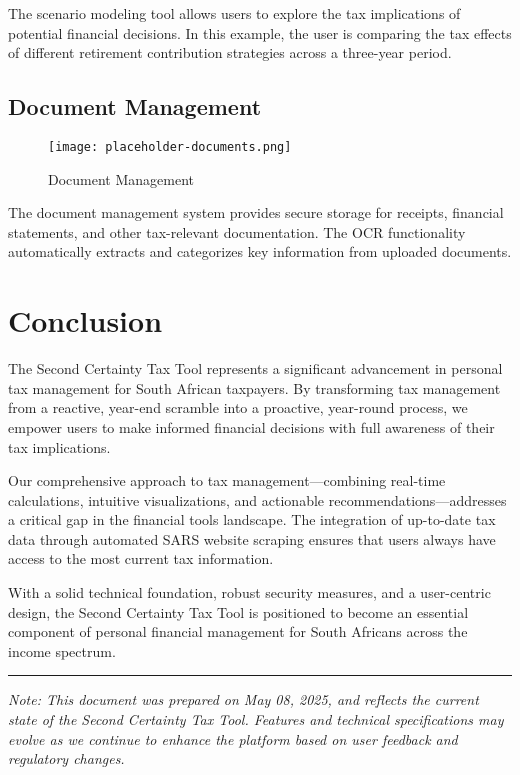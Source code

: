 \documentclass[
  11pt,
  letterpaper,
]{article}
\begin{document}
The scenario modeling tool allows users to explore the tax implications
of potential financial decisions. In this example, the user is comparing
the tax effects of different retirement contribution strategies across a
three-year period.

\hypertarget{document-management}{%
\subsection{Document Management}\label{document-management}}

\begin{figure}

{\centering \texttt{[image: placeholder-documents.png]}

}

\caption{Document Management}

\end{figure}

The document management system provides secure storage for receipts,
financial statements, and other tax-relevant documentation. The OCR
functionality automatically extracts and categorizes key information
from uploaded documents.

\hypertarget{conclusion}{%
\section{Conclusion}\label{conclusion}}

The Second Certainty Tax Tool represents a significant advancement in
personal tax management for South African taxpayers. By transforming tax
management from a reactive, year-end scramble into a proactive,
year-round process, we empower users to make informed financial
decisions with full awareness of their tax implications.

Our comprehensive approach to tax management---combining real-time
calculations, intuitive visualizations, and actionable
recommendations---addresses a critical gap in the financial tools
landscape. The integration of up-to-date tax data through automated SARS
website scraping ensures that users always have access to the most
current tax information.

With a solid technical foundation, robust security measures, and a
user-centric design, the Second Certainty Tax Tool is positioned to
become an essential component of personal financial management for South
Africans across the income spectrum.

\begin{center}\rule{0.5\linewidth}{0.5pt}\end{center}

\emph{Note: This document was prepared on May 08, 2025, and reflects the
current state of the Second Certainty Tax Tool. Features and technical
specifications may evolve as we continue to enhance the platform based
on user feedback and regulatory changes.}
\end{document}
